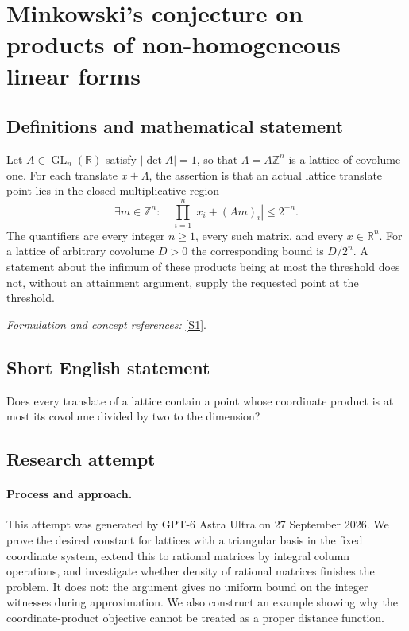 \documentclass[11pt]{article}
\begin{document}
\section*{\texorpdfstring{Minkowski's conjecture on products of non-homogeneous linear forms}{Minkowski's conjecture on products of non-homogeneous linear forms}}\label{30006927}
\subsection{Definitions and mathematical statement}
Let $A\in\operatorname{GL}_n({\mathbb{R}})$ satisfy $|\det A|=1$, so that $\Lambda=A{\mathbb{Z}}^n$ is a lattice of covolume one. For each translate $x+\Lambda$, the assertion is that an actual lattice translate point lies in the closed multiplicative region
\[
 \exists m\in{\mathbb{Z}}^n:\quad \prod_{i=1}^n|x_i+(Am)_i|\le2^{-n}.
\]
The quantifiers are every integer $n\ge1$, every such matrix, and every $x\in{\mathbb{R}}^n$. For a lattice of arbitrary covolume $D>0$ the corresponding bound is $D/2^n$. A statement about the infimum of these products being at most the threshold does not, without an attainment argument, supply the requested point at the threshold.
\par\smallskip\textit{Formulation and concept references:} \href{https://arxiv.org/pdf/2009.09992v1}{[S1]}.

\subsection{Short English statement}
Does every translate of a lattice contain a point whose coordinate product is at most its covolume divided by two to the dimension?
\subsection{Research attempt}
\paragraph{Process and approach.}
This attempt was generated by GPT-6 Astra Ultra on 27 September 2026. We prove the desired constant for lattices with a triangular basis in the fixed coordinate system, extend this to rational matrices by integral column operations, and investigate whether density of rational matrices finishes the problem. It does not: the argument gives no uniform bound on the integer witnesses during approximation. We also construct an example showing why the coordinate-product objective cannot be treated as a proper distance function.
\end{document}
